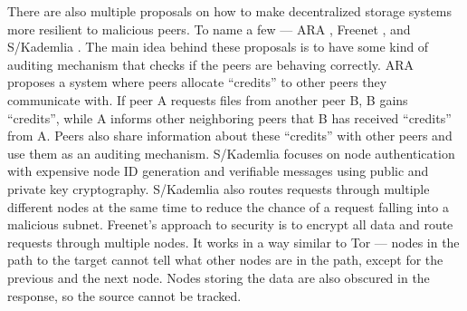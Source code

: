 There are also multiple proposals on how to make decentralized storage systems more resilient to malicious peers.
To name a few — ARA \cite{ara}, Freenet \cite{freenet}, and S/Kademlia \cite{skademlia}.
The main idea behind these proposals is to have some kind of auditing mechanism that checks if the peers are behaving correctly.
ARA proposes a system where peers allocate “credits” to other peers they communicate with.
If peer A requests files from another peer B, B gains “credits”, while A informs other neighboring peers
that B has received “credits” from A.
Peers also share information about these “credits” with other peers and use them as an auditing mechanism.
S/Kademlia focuses on node authentication with expensive node ID generation and verifiable messages using
public and private key cryptography.
S/Kademlia also routes requests through multiple different nodes at the same time
to reduce the chance of a request falling into a malicious subnet.
Freenet's approach to security is to encrypt all data and route requests through multiple nodes.
It works in a way similar to Tor — nodes in the path to the target cannot tell what other nodes are in the path,
except for the previous and the next node.
Nodes storing the data are also obscured in the response, so the source cannot be tracked.
